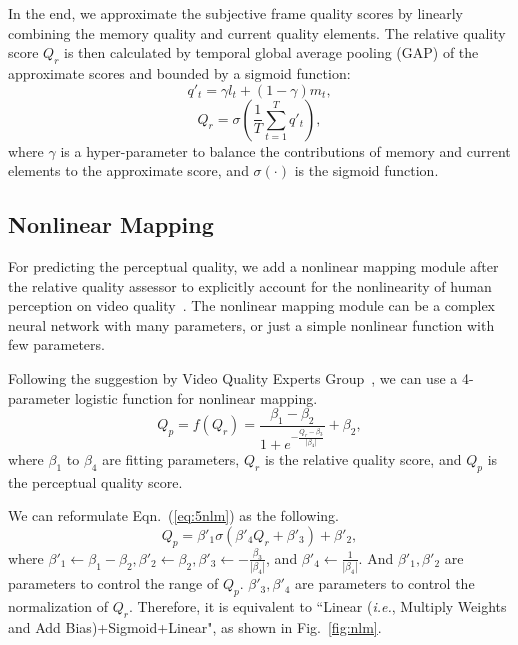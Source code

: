 \documentclass[twocolumn]{svjour3}          \smartqed  \usepackage{graphicx}
\begin{document}
In the end, we approximate the subjective frame quality scores by linearly combining the memory quality and current quality elements. 
The relative quality score $Q_r$ is then calculated by temporal global average pooling (GAP) of the approximate scores and bounded by a sigmoid function:
\begin{equation}\label{eq:approximate quality}
q'_t  = \gamma l_t + (1-\gamma)m_t,
\end{equation}
\begin{equation}\label{eq:video quality}
Q_r  = \sigma\left(\frac{1}{T}\sum_{t=1}^{T}q'_t\right),
\end{equation}
where $\gamma$ is a hyper-parameter to balance the contributions of memory and current elements to the approximate score, and $\sigma(\cdot)$ is the sigmoid function.

\subsection{Nonlinear Mapping}
For predicting the perceptual quality, we add a nonlinear mapping module after the relative quality assessor to explicitly account for the nonlinearity of human perception on video quality~\citep{vqeg2000fr}. 
The nonlinear mapping module can be a complex neural network with many parameters, or just a simple nonlinear function with few parameters. 

Following the suggestion by Video Quality Experts Group~\citep{vqeg2000fr}, we can use a 4-parameter logistic function for nonlinear mapping.
\begin{equation}\label{eq:5nlm}
Q_p = f(Q_r)= \frac{\beta_1-\beta_2}{1+e^{-\frac{Q_r-\beta_3}{|\beta_4|}}}+\beta_2,
\end{equation}
where $\beta_1$ to $\beta_4$ are fitting parameters, $Q_r$ is the relative quality score, and $Q_p$ is the perceptual quality score.

We can reformulate Eqn.~(\ref{eq:5nlm}) as the following.
\begin{equation}\label{eq:new5nlm}
Q_p = \beta'_1\sigma{(\beta'_4Q_r+\beta'_3)}+\beta'_2,
\end{equation}
where $\beta'_1\leftarrow\beta_1-\beta_2, \beta'_2\leftarrow\beta_2, \beta'_3\leftarrow-\frac{\beta_3}{|\beta_4|}$, and $\beta'_4\leftarrow \frac{1}{|\beta_4|}$. 
And $\beta'_1, \beta'_2$ are parameters to control the range of $Q_p$. $\beta'_3, \beta'_4$ are parameters to control the normalization of $Q_r$. 
Therefore, it is equivalent to ``Linear (\textit{i.e.}, Multiply Weights and Add Bias)+Sigmoid+Linear", as shown in Fig.~\ref{fig:nlm}. 
\end{document}
